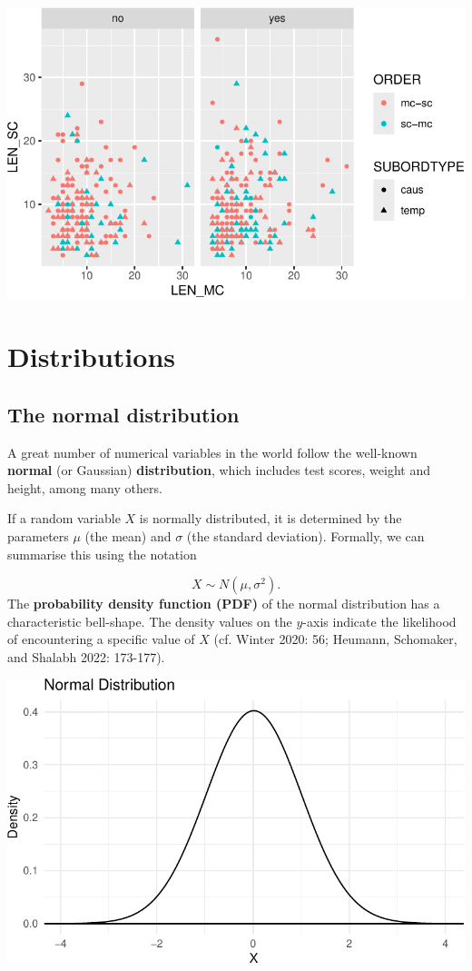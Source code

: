\documentclass[
  11pt,
  letterpaper,
  DIV=11,
  numbers=noendperiod]{scrreprt}
\begin{document}
\includegraphics{Summary_statistics_files/figure-pdf/unnamed-chunk-29-1.pdf}

\chapter{Distributions}\label{distributions}

\section{The normal distribution}\label{the-normal-distribution}

A great number of numerical variables in the world follow the well-known
\textbf{normal} (or Gaussian) \textbf{distribution}, which includes test
scores, weight and height, among many others.

If a random variable \(X\) is normally distributed, it is determined by
the parameters \(\mu\) (the mean) and \(\sigma\) (the standard
deviation). Formally, we can summarise this using the notation

\[ X \sim N(\mu, \sigma^2).\] The \textbf{probability density function
(PDF)} of the normal distribution has a characteristic bell-shape. The
density values on the \(y\)-axis indicate the likelihood of encountering
a specific value of \(X\) (cf. Winter 2020: 56; Heumann, Schomaker, and
Shalabh 2022: 173-177).

\includegraphics{Distributions_files/figure-pdf/unnamed-chunk-2-1.pdf}
\end{document}
